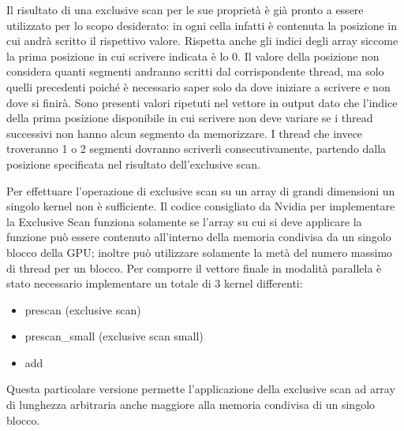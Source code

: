 \documentclass[12pt,a4paper]{report}
\begin{document}
\begin{figure}[H]
\centering
\begin{floatrow}[1]
\end{floatrow}
\end{figure} 
Il risultato di una exclusive scan per le sue proprietà è già pronto a essere utilizzato per lo scopo desiderato: in ogni cella infatti è contenuta la posizione in cui andrà scritto il rispettivo valore. Rispetta anche gli indici degli array siccome la prima posizione in cui scrivere indicata è lo 0. Il valore della posizione non considera quanti segmenti andranno scritti dal corrispondente thread, ma solo quelli precedenti poiché è necessario saper solo da dove iniziare a scrivere e non dove si finirà. \newline
Sono presenti valori ripetuti nel vettore in output dato che l'indice della prima posizione disponibile in cui scrivere non deve variare se i thread successivi non hanno alcun segmento da memorizzare. I thread che invece troveranno 1 o 2 segmenti dovranno scriverli consecutivamente, partendo dalla posizione specificata nel risultato dell'exclusive scan. \newpage

Per effettuare l'operazione di exclusive scan su un array di grandi dimensioni un singolo kernel non è sufficiente.
Il codice consigliato da Nvidia per implementare la Exclusive Scan funziona solamente se l’array su cui si deve applicare la funzione può essere contenuto all’interno della memoria condivisa da un singolo blocco della GPU; inoltre può utilizzare solamente la metà del numero massimo di thread per un blocco. \newline
Per comporre il vettore finale in modalità parallela è stato necessario implementare un totale di 3 kernel differenti:
\begin{itemize}
    \item prescan (exclusive scan)
    \item prescan\_small  (exclusive scan small)
    \item add
\end{itemize}
Questa particolare versione permette l'applicazione della exclusive scan ad array di lunghezza arbitraria anche maggiore alla memoria condivisa di un singolo blocco. \newline
\end{document}
